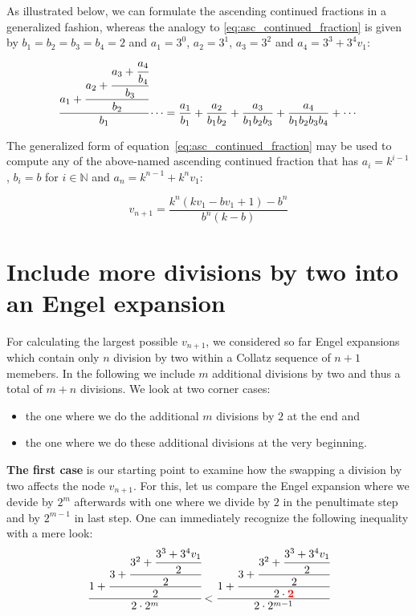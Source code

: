 \par\noindent
As illustrated below, we can formulate the ascending continued fractions in a generalized fashion, whereas the analogy to \ref{eq:asc_continued_fraction} is given by $b_1=b_2=b_3=b_4=2$ and $a_1=3^0$, $a_2=3^1$, $a_3=3^2$ and $a_4=3^3+3^4v_1$:
\[
\cfrac{a_1+\cfrac{a_2+\cfrac{a_3+\cfrac{a_4}{b_4}}{b_3}}{b_2}}{b_1}\dotsb=\frac{a_1}{b_1}+\frac{a_2}{b_1b_2}+\frac{a_3}{b_1b_2b_3}+\frac{a_4}{b_1b_2b_3b_4}+\cdots
\]

\par\medskip
The generalized form of equation~\ref{eq:asc_continued_fraction} may be used to compute any of the above-named ascending continued fraction that has $a_i=k^{i-1}$, $b_i=b$ for $i\in\mathbb{N}$ and $a_n=k^{n-1}+k^nv_1$:

\par\medskip
\begin{equation}
\label{eq:generalized_asc_continued_fraction}
v_{n+1}=\frac{k^n(kv_1-bv_1+1)-b^n}{b^n(k-b)}
\end{equation}

\section{Include more divisions by two into an Engel expansion}
\label{sec:include_divisions_engel_expansion}
For calculating the largest possible $v_{n+1}$, we considered so far Engel expansions which contain only $n$ division by two within a Collatz sequence of $n+1$ memebers. In the following we include $m$ additional divisions by two and thus a total of $m+n$ divisions. We look at two corner cases:
\begin{itemize}
	\item the one where we do the additional $m$ divisions by $2$ at the end and
	\item the one where we do these additional divisions at the very beginning.
\end{itemize}

\par\noindent
\textbf{The first case} is our starting point to examine how the swapping a division by two affects the node $v_{n+1}$. For this, let us compare the Engel expansion where we devide by $2^m$ afterwards with one where we divide by $2$ in the penultimate step and by $2^{m-1}$ in last step. One can immediately recognize the following inequality with a mere look:
\[
\cfrac{1+\cfrac{3+\cfrac{3^2+\cfrac{3^3+3^4v_1}{2}}{2}}{2}}{2\cdot2^m}
<
\cfrac{1+\cfrac{3+\cfrac{3^2+\cfrac{3^3+3^4v_1}{2}}{2}}{2\cdot\textcolor{red}{\mathbf{2}}}}{2\cdot2^{m-1}}
\]

